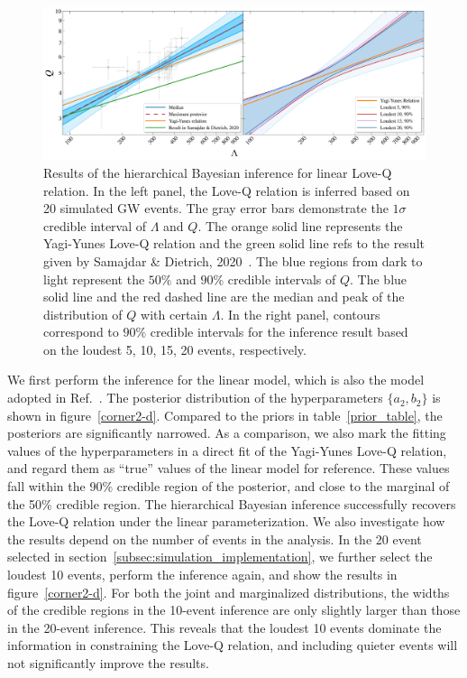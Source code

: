 \documentclass[a4paper,11pt]{article}
\begin{document}
\begin{figure}
\centering
\includegraphics[width=\textwidth]{hierarchical_results_APR4_2d.pdf}
    \caption{Results of the hierarchical Bayesian inference for linear Love-Q relation. In the left panel, the Love-Q relation is inferred based on 20 simulated GW events. The gray error bars demonstrate the $1\sigma$ credible interval of $\Lambda$ and $Q$. The orange solid line represents the Yagi-Yunes Love-Q relation and the green solid line refs to the result given by Samajdar \& Dietrich, 2020~\cite{Samajdar:2020xrd}. The blue regions from dark to light represent the $50\%$ and $90\%$ credible intervals of $Q$. The blue solid line and the red dashed line are the median and peak of the distribution of $Q$ with certain $\Lambda$. In the right panel, contours correspond to $90\%$ credible intervals for the inference result based on the loudest 5, 10, 15, 20 events, respectively.
    \label{2-d_Love_Q}}
\end{figure}
We first perform the inference for the linear model, which is also the model adopted in Ref.~\cite{Samajdar:2020xrd}. The posterior distribution of the hyperparameters $\{a_2,b_2\}$ is shown in figure~\ref{corner2-d}. Compared
to the priors in table~\ref{prior_table}, the posteriors are significantly narrowed. As a comparison, we also mark the fitting values of the hyperparameters in a direct fit of the Yagi-Yunes Love-Q relation, and regard them as ``true'' values of the linear model for reference. These values fall within the 90\% credible region of the posterior, and close to the marginal of the 50\% credible region. The hierarchical Bayesian inference successfully recovers the Love-Q relation under the linear parameterization. We also investigate how the results depend on the number of events in the analysis. In the 20 event selected in section~\ref{subsec:simulation_implementation}, we further select the loudest 10 events, perform the inference again, and show the results in figure~\ref{corner2-d}. For both the joint and marginalized distributions, the widths of the credible regions in the 10-event inference are only slightly larger than those in the 20-event inference. This reveals that the loudest 10 events dominate the information in constraining the Love-Q relation, and including quieter events will not significantly improve the results.
\end{document}
